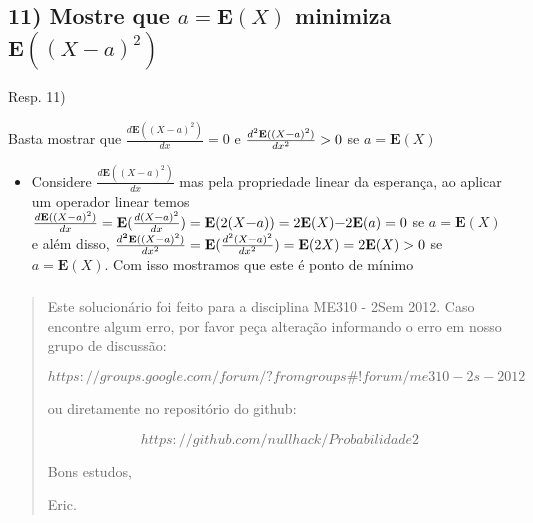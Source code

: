 \documentclass[portuguese]{article}
\begin{document}
\subsubsection*{\textcompwordmark{}}


\subsection*{\textmd{11) Mostre que $a=\mathbf{E}(X)$ minimiza $\mathbf{E}((X-a)^{2})$ }}

Resp. 11) 

Basta mostrar que $\frac{d\mathbf{E}((X-a)^{2})}{dx}=0$ e $\frac{d^{2}\mathbf{E}((X\text{\textminus}a)^{2})}{dx^{2}}>0$
se $a=\mathbf{E}(X)$
\begin{itemize}
\item Considere $\frac{d\mathbf{E}((X-a)^{2})}{dx}$ mas pela propriedade
linear da esperança, ao aplicar um operador linear temos $\frac{d\mathbf{E}((X-a)^{2})}{dx}=\mathbf{E}(\frac{d(X\text{\textminus}a)^{2}}{dx})=\mathbf{E}(2(X\text{\textminus}a))=2\mathbf{E}(X)\text{\textminus}2\mathbf{E}(a)=0$
se $a=\mathbf{E}(X)$ e além disso, $\frac{d\mathbf{^{2}E}((X-a)^{2})}{dx^{2}}=\mathbf{E}(\frac{d^{2}(X\text{\textminus}a)^{2}}{dx^{2}})=\mathbf{E}(2X)=2\mathbf{E}(X)>0$
se $a=\mathbf{E}(X)$. Com isso mostramos que este é ponto de mínimo
\end{itemize}

\subsubsection*{\pagebreak{}}
\begin{quotation}
Este solucionário foi feito para a disciplina ME310 - 2Sem 2012. Caso
encontre algum erro, por favor peça alteração informando o erro em
nosso grupo de discussão: 

$$https://groups.google.com/forum/?fromgroups\#!forum/me310-2s-2012$$

ou diretamente no repositório do github:

$$https://github.com/nullhack/Probabilidade2$$

Bons estudos,

Eric.\end{quotation}
\end{document}
